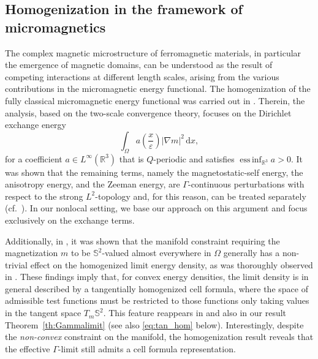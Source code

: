 \documentclass[reqno,11pt]{amsart}
\numberwithin{equation}{section}
\theoremstyle{thmlemcorr}
\numberwithin{theorem}{section}
\theoremstyle{thmlemcorr*}
\theoremstyle{defi}
\theoremstyle{remexample}
\theoremstyle{ass}
\newcommand{\R}{\mathbb{R}}
\renewcommand{\S}{\mathbb{S}}
\DeclareMathOperator*{\essinf}{ess\,inf}
\newcommand{\1}{\mathds{1}}
\newcommand{\Om}{\Omega}
\newcommand{\veps}{\varepsilon}
\newcommand{\dl}{\,\mathrm{d}}
\begin{document}
	
	\subsection*{Homogenization in the framework of micromagnetics}

 The complex magnetic microstructure of ferromagnetic materials, in particular the emergence of magnetic domains, can be understood as the result of competing interactions at different length scales, arising from the various contributions in the micromagnetic energy functional. The homogenization of the fully classical micromagnetic energy functional was carried out in \cite{AlDF15}. Therein, the analysis, based on the two-scale convergence theory, focuses on the Dirichlet exchange energy
\begin{equation}\label{eq:only_ex}
		\int_\Om a\left(\frac{x}{\veps}\right)|\nabla m|^2 \dl x,
	\end{equation}
	for a coefficient \(a\in L^\infty(\R^3)\) that is $Q$-periodic and satisfies $\essinf_{\R^3}a>0$. %
    It was shown that the remaining terms, namely the magnetostatic-self energy, the anisotropy energy, and the Zeeman energy, are \(\Gamma\)-continuous perturbations with respect to the strong $L^2$-topology and, for this reason, can be treated separately (cf.\  \cite[Proposition~6.20]{DM93}). In our nonlocal setting, we base our approach on this argument and focus exclusively on the exchange terms.
    
    Additionally, in \cite{AlDF15}, it was shown that the manifold constraint requiring the magnetization $m$ to be $\S^2$-valued almost everywhere in $\Om$ generally has a non-trivial effect on the homogenized limit energy density, as was thoroughly observed in \cite{BaMi10}. These findings imply that, for convex energy densities, the limit density is in general described by a tangentially homogenized cell formula, where the space of admissible test functions must be restricted to those functions only taking values in the tangent space \(T_m\S^2\). This feature reappears in \cite{AlDF15} and also in our result Theorem~\ref{th:Gammalimit} (see also \eqref{eq:tan_hom} below). Interestingly,  despite the \textit{non-convex} constraint on the manifold, the homogenization result reveals that the effective \(\Gamma\)-limit still admits a cell formula representation. 
    
\end{document}
